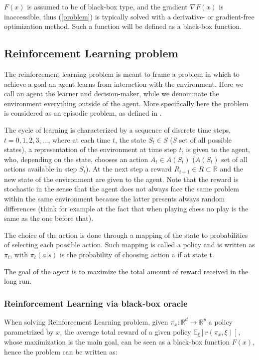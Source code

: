 $F(x)$ is assumed to be of black-box type, and the gradient $\nabla F(x)$ is inaccessible, thus (\ref{problem}) is typically solved with a derivative- or gradient-free optimization method. Such a function will be defined as a black-box function.

\subsection{Reinforcement Learning problem}

The reinforcement learning problem is meant to frame a problem in which to achieve a goal an agent learns from interaction with the environment. Here we call an agent the learner and decision-maker, while we denominate the environment everything outside of the agent. More specifically here the problem is considered as an episodic problem, as defined in \cite{SuttonBarto}.

The cycle of learning is characterized by a sequence of discrete time steps, $t=0,1,2,3,\dots$, where at each time $t$, the state $S_t\in S$ ($S$ set of all possible states), a representation of the environment at time step $t$, is given to the agent, who, depending on the state, chooses an action $A_t\in A(S_t)$ ($A(S_t)$ set of all actions available in step $S_t$). At the next step a reward $R_{t+1}\in R \subset \mathbb{R}$ and the new state of the environment are given to the agent. Note that the reward is stochastic in the sense that the agent does not always face the same problem within the same environment because the latter presents always random differences (think for example at the fact that when playing chess no play is the same as the one before that).

The choice of the action is done through a mapping of the state to probabilities of selecting each possible action. Such mapping is called a policy and is written as $\pi_t$, with $\pi_t (a|s)$ is the probability of choosing action a if at state t.

The goal of the agent is to maximize the total amount of reward received in the long run.

\subsubsection{Reinforcement Learning via black-box oracle}

When solving Reinforcement Learning problem, given $\pi_x : \mathbb{R}^d \rightarrow \mathbb{R}^p$ a policy parametrized by $x$, the average total reward of a given policy $ \mathbb{E}_{\xi}\left[r\left(\pi_x, \xi\right)\right]$, whose maximization is the main goal, can be seen as a black-box function $F(x)$, hence the problem can be written as:

